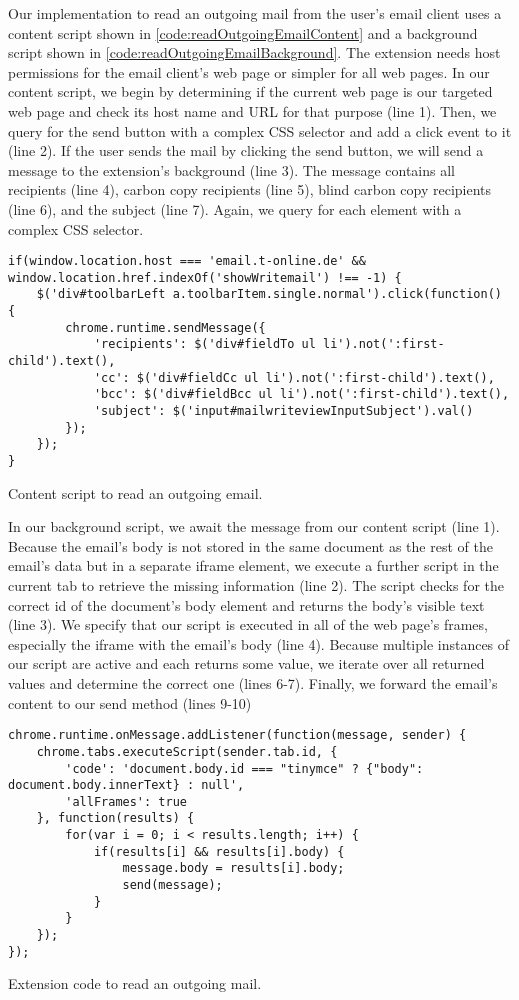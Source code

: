 	Our implementation to read an outgoing mail from the user's email client uses a content script shown in \autoref{code:readOutgoingEmailContent} and a background script shown in \autoref{code:readOutgoingEmailBackground}. The extension needs host permissions for the email client's web page or simpler for all web pages. In our content script, we begin by determining if the current web page is our targeted web page and check its host name and URL for that purpose (line 1). Then, we query for the send button with a complex CSS selector and add a click event to it (line 2). If the user sends the mail by clicking the send button, we will send a message to the extension's background (line 3). The message contains all recipients (line 4), carbon copy recipients (line 5), blind carbon copy recipients (line 6), and the subject (line 7). Again, we query for each element with a complex CSS selector.
	
	\begin{code}
		\begin{lstlisting}
if(window.location.host === 'email.t-online.de' && window.location.href.indexOf('showWritemail') !== -1) {
	$('div#toolbarLeft a.toolbarItem.single.normal').click(function() {
		chrome.runtime.sendMessage({
			'recipients': $('div#fieldTo ul li').not(':first-child').text(),
			'cc': $('div#fieldCc ul li').not(':first-child').text(),
			'bcc': $('div#fieldBcc ul li').not(':first-child').text(),
			'subject': $('input#mailwriteviewInputSubject').val()
		});
	});
}
\end{lstlisting}
		\caption{Content script to read an outgoing email.}
		\label{code:readOutgoingEmailContent}
	\end{code}
	
	In our background script, we await the message from our content script (line 1). Because the email's body is not stored in the same document as the rest of the email's data but in a separate iframe element, we execute a further script in the current tab to retrieve the missing information (line 2). The script checks for the correct id of the document's body element and returns the body's visible text (line 3). We specify that our script is executed in all of the web page's frames, especially the iframe with the email's body (line 4). Because multiple instances of our script are active and each returns some value, we iterate over all returned values and determine the correct one (lines 6-7). Finally, we forward the email's content to our send method (lines 9-10) 
	
	\begin{code}
		\begin{lstlisting}
chrome.runtime.onMessage.addListener(function(message, sender) {
	chrome.tabs.executeScript(sender.tab.id, {
		'code': 'document.body.id === "tinymce" ? {"body": document.body.innerText} : null',
		'allFrames': true
	}, function(results) {
		for(var i = 0; i < results.length; i++) {
			if(results[i] && results[i].body) {
				message.body = results[i].body;
				send(message);
			}
		}
	});
});
\end{lstlisting}
		\caption{Extension code to read an outgoing mail.}
		\label{code:readOutgoingEmailBackground}
	\end{code}
	
